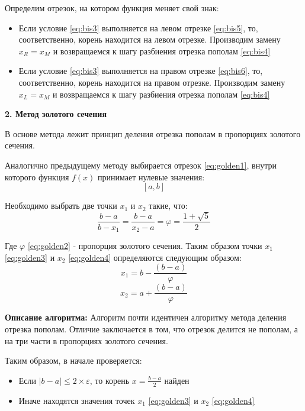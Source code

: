 \documentclass[a4paper, 12pt]{article}   	%
\begin{document}
Определим отрезок, на котором функция меняет свой знак:
\begin{itemize}
 \item Если условие \eqref{eq:bis3} выполняется на левом отрезке \eqref{eq:bis5}, то, соответственно, корень находится на левом отрезке. Производим замену $x_R = x_M$ и возвращаемся к шагу разбиения отрезка пополам \eqref{eq:bis4}
 \item Если условие \eqref{eq:bis3} выполняется на правом отрезке \eqref{eq:bis6}, то, соответственно, корень находится на правом отрезке. Производим замену $x_L = x_M$ и возвращаемся к шагу разбиения отрезка пополам \eqref{eq:bis4}
 \end{itemize}

\textbf{2. Метод золотого сечения}

В основе метода лежит принцип деления отрезка пополам в пропорциях золотого сечения. 

Аналогично предыдущему методу выбирается отрезок \eqref{eq:golden1}, внутри которого функция $f(x)$ принимает нулевые значения:
\begin{equation}\label{eq:golden1}
[a, b]
\end{equation}

Необходимо выбрать две точки $x_1$ и $x_2$ такие, что:
\begin{equation}\label{eq:golden2}
\frac{b - a}{b-x_1} = \frac{b-a}{x_2-a}=\varphi = \frac{1 + \sqrt{5}}{2}
\end{equation}

Где $\varphi$ \eqref{eq:golden2} - пропорция золотого сечения. Таким образом точки $x_1$ \eqref{eq:golden3} и $x_2$ \eqref{eq:golden4} определяются следующим образом:
\begin{equation}\label{eq:golden3}
x_1 = b - \frac{(b-a)}{\varphi}
\end{equation}
\begin{equation}\label{eq:golden4}
x_2 = a + \frac{(b-a)}{\varphi}
\end{equation}

\textbf{Описание алгоритма: }
Алгоритм почти идентичен алгоритму метода деления отрезка пополам. Отличие заключается в том, что отрезок делится не пополам, а на три части в пропорциях золотого сечения.

Таким образом, в начале проверяется:
 \begin{itemize}
 \item Если $|b - a| \leq 2 \times \varepsilon$, то корень $x = \frac{b-a}{2}$ найден
 \item Иначе находятся значения точек $x_1$ \eqref{eq:golden3} и $x_2$ \eqref{eq:golden4}
 \end{itemize}
 
\end{document}
